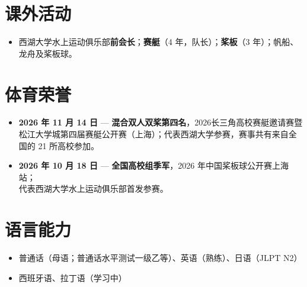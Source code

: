 \documentclass[10pt]{article}
\begin{document}
\section*{课外活动}
\begin{itemize}
    \item 西湖大学水上运动俱乐部\textbf{前会长}；\textbf{赛艇}（4 年，队长）；\textbf{桨板}（3 年）；帆船、龙舟及桨板球。
\end{itemize}

\section*{体育荣誉}
\begin{itemize}
    \item \textbf{2026 年 11 月 14 日} --- \textbf{混合双人双桨第四名}，2026长三角高校赛艇邀请赛暨松江大学城第四届赛艇公开赛（上海）；代表西湖大学参赛，赛事共有来自全国的 21 所高校参加。
    \item \textbf{2026 年 10 月 18 日} --- \textbf{全国高校组季军}，2026 年中国桨板球公开赛上海站；\\
    代表西湖大学水上运动俱乐部首发参赛。
\end{itemize}

\section*{语言能力}
\begin{itemize}
    \item 普通话（母语；普通话水平测试一级乙等）、英语（熟练）、日语（JLPT N2）
    \item 西班牙语、拉丁语（学习中）
\end{itemize}
\end{document}
